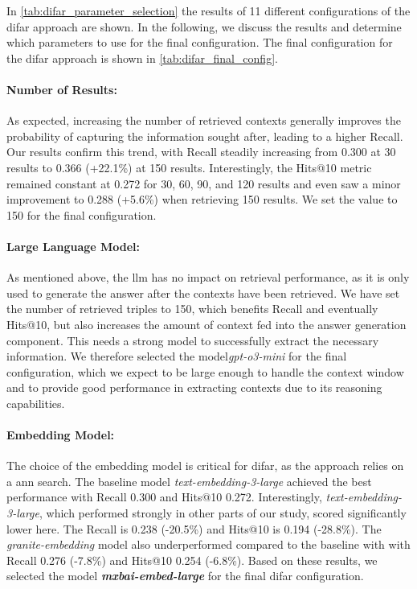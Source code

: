 In \autoref{tab:difar_parameter_selection} the results of 11 different configurations of the \gls{difar} approach are shown. In the following, we discuss the results and determine which parameters to use for the final configuration. The final configuration for the \gls{difar} approach is shown in \autoref{tab:difar_final_config}.

\paragraph{Number of Results:} 
As expected, increasing the number of retrieved contexts generally improves the probability of capturing the information sought after, leading to a higher Recall. Our results confirm this trend, with Recall steadily increasing from 0.300 at 30 results to 0.366 (+22.1\%) at 150 results. Interestingly, the Hits@10 metric remained constant at 0.272 for 30, 60, 90, and 120 results and even saw a minor improvement to 0.288 (+5.6\%) when retrieving 150 results. We set the value to 150 for the final configuration.

\paragraph{Large Language Model:}
As mentioned above, the \gls{llm} has no impact on retrieval performance, as it is only used to generate the answer after the contexts have been retrieved. We have set the number of retrieved triples to 150, which benefits Recall and eventually Hits@10, but also increases the amount of context fed into the answer generation component. This needs a strong model to successfully extract the necessary information. We therefore selected the model\emph{gpt-o3-mini} for the final configuration, which we expect to be large enough to handle the context window and to provide good performance in extracting contexts due to its reasoning capabilities.

\paragraph{Embedding Model:} 
The choice of the embedding model is critical for \gls{difar}, as the approach relies on a \gls{ann} search. The baseline model \emph{text-embedding-3-large} achieved the best performance with Recall 0.300 and Hits@10 0.272. Interestingly, \emph{text-embedding-3-large}, which performed strongly in other parts of our study, scored significantly lower here. The Recall is 0.238 (-20.5\%) and Hits@10 is 0.194 (-28.8\%). The \emph{granite-embedding} model also underperformed compared to the baseline with with Recall 0.276 (-7.8\%) and Hits@10 0.254 (-6.8\%). Based on these results, we selected the model \textbf{\emph{mxbai-embed-large}} for the final \gls{difar} configuration.

